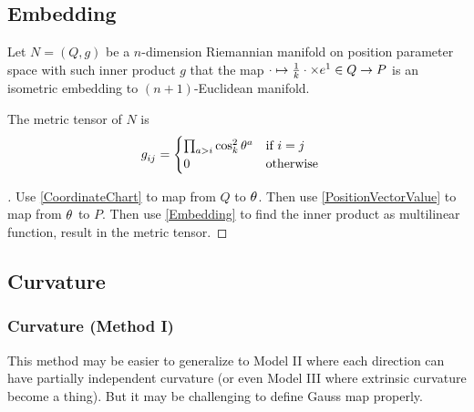 \documentclass[stu, babel, american, biblatex, a4paper, draftall]{apa7}
\begin{document}
\subsection{Embedding}
\begin{definition}\label{Embedding}
    Let $N=\left(Q,g\right)$ be a $n$-dimension Riemannian manifold
    on position parameter space with such inner product $g$ that
    the map $\cdot\mapsto\frac{1}{k}\cdot\times\tensor{e}{^1}\in Q\to P$ is an isometric embedding to $\left(n+1\right)$-Euclidean manifold.
\end{definition}
\begin{lemma}\label{MetricTensor}
    The metric tensor of $N$ is
    \begin{align*}
        \tensor{g}{_i_j} & =
        \begin{cases}
            \prod_{a>i}{\cos_k^2{\tensor{\theta}{^a}}} & \text{if $i=j$}  \\
            0                                          & \text{otherwise} \\
        \end{cases}
    \end{align*}
\end{lemma}
\begin{proof}[]
    \skipped

    Use \cref{CoordinateChart} to map from $Q$ to $\tensor{\theta}{}$.
    Then use \cref{PositionVectorValue} to map from $\tensor{\theta}{}$ to $P$.
    Then use \cref{Embedding} to find the inner product as multilinear function, result in the metric tensor.
\end{proof}
\subsection{Curvature}
\subsubsection{Curvature (Method I)}
This method may be easier to generalize to
Model II where each direction can have partially independent curvature
(or even Model III where extrinsic curvature become a thing).
But it may be challenging to define Gauss map properly.
\begin{lemma}\label{GaussMap}

\end{lemma}
\begin{lemma}\label{SecondFundamental}

\end{lemma}
\begin{lemma}\label{PrincipalCurvature}

\end{lemma}
\end{document}
